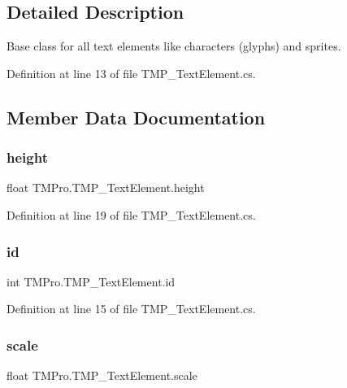 \subsection{Detailed Description}
Base class for all text elements like characters (glyphs) and sprites. 



Definition at line 13 of file T\+M\+P\+\_\+\+Text\+Element.\+cs.



\subsection{Member Data Documentation}
\mbox{\label{class_t_m_pro_1_1_t_m_p___text_element_a8e0536e8531dafd5cd8737d0c4fb28bc}} 
\subsubsection{\texorpdfstring{height}{height}}
{\footnotesize\ttfamily float T\+M\+Pro.\+T\+M\+P\+\_\+\+Text\+Element.\+height}



Definition at line 19 of file T\+M\+P\+\_\+\+Text\+Element.\+cs.

\mbox{\label{class_t_m_pro_1_1_t_m_p___text_element_ad6929a466e937d3db703223dfe1e66c7}} 
\subsubsection{\texorpdfstring{id}{id}}
{\footnotesize\ttfamily int T\+M\+Pro.\+T\+M\+P\+\_\+\+Text\+Element.\+id}



Definition at line 15 of file T\+M\+P\+\_\+\+Text\+Element.\+cs.

\mbox{\label{class_t_m_pro_1_1_t_m_p___text_element_a555701c73d767af5770e029ef3b243b2}} 
\subsubsection{\texorpdfstring{scale}{scale}}
{\footnotesize\ttfamily float T\+M\+Pro.\+T\+M\+P\+\_\+\+Text\+Element.\+scale}



